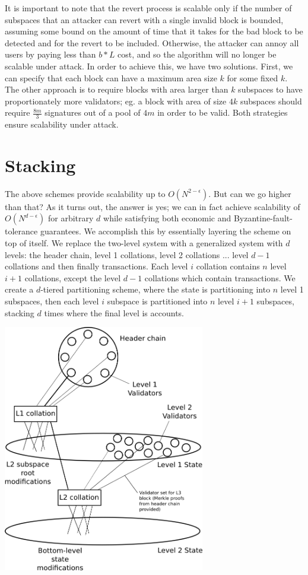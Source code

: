 \documentclass[11pt,a4paper]{article}
\theoremstyle{plain}
\theoremstyle{definition}
\theoremstyle{remark}
\begin{document}
It is important to note that the revert process is scalable only if the number of subspaces that an attacker can revert with a single invalid block is bounded, assuming some bound on the amount of time that it takes for the bad block to be detected and for the revert to be included. Otherwise, the attacker can annoy all users by paying less than $b * L$ cost, and so the algorithm will no longer be scalable under attack. In order to achieve this, we have two solutions. First, we can specify that each block can have a maximum area size $k$ for some fixed $k$. The other approach is to require blocks with area larger than $k$ subspaces to have proportionately more validators; eg. a block with area of size $4k$ subspaces should require $\frac{8m}{3}$ signatures out of a pool of $4m$ in order to be valid. Both strategies ensure scalability under attack.

\section{Stacking}

The above schemes provide scalability up to $O(N^{2-\epsilon})$. But can we go higher than that? As it turns out, the answer is yes; we can in fact achieve scalability of $O(N^{d-\epsilon})$ for arbitrary $d$ while satisfying both economic and Byzantine-fault-tolerance guarantees. We accomplish this by essentially layering the scheme on top of itself. We replace the two-level system with a generalized system with $d$ levels: the header chain, level 1 collations, level 2 collations ... level $d-1$ collations and then finally transactions. Each level $i$ collation contains $n$ level $i+1$ collations, except the level $d-1$ collations which contain transactions. We create a $d$-tiered partitioning scheme, where the state is partitioning into $n$ level 1 subspaces, then each level $i$ subspace is partitioned into $n$ level $i+1$ subspaces, stacking $d$ times where the final level is accounts.

\begin{center}
\includegraphics[width=250pt]{multilevel.png}
\end{center}
\end{document}
